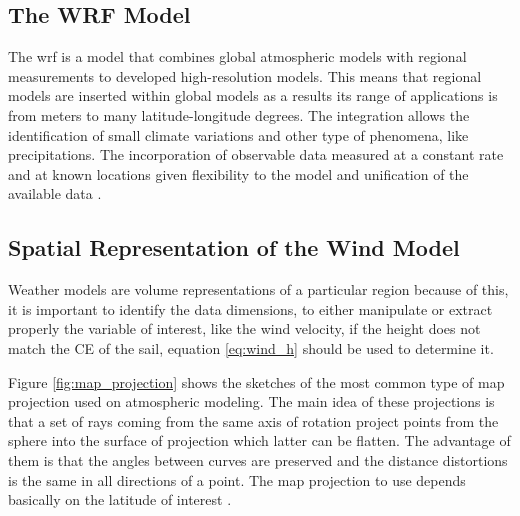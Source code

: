 \subsection{The WRF Model }
The \acrshort{wrf} is a model that combines global atmospheric models with regional measurements to developed high-resolution models. This means that regional models are inserted within global models as a results its range of applications is from meters to many latitude-longitude degrees. The integration allows the identification of small climate variations and other type of phenomena, like precipitations. The incorporation of observable data measured at a constant rate and at known locations given flexibility to the model and unification of the available data \cite{warner2010numerical}. \par

\subsection{Spatial Representation of the Wind Model}

Weather models are volume representations of a particular region because of this, it is important to identify the data dimensions, to either manipulate or extract properly the variable of interest, like the wind velocity, if the height does not match the CE of the sail, equation \ref{eq:wind_h} should be used to determine it. \par \noindent %
Figure \ref{fig:map_projection} shows the sketches of the most common type of map projection used on atmospheric modeling. The main idea of these projections is that a set of rays coming from the same axis of rotation project points from the sphere into the surface of projection which latter can be flatten. %
The advantage of them %
is that the angles between curves are preserved and the distance distortions is the same in all directions of a point. The map projection to use depends basically %
on the latitude of interest \cite{warner2010numerical}. \par


